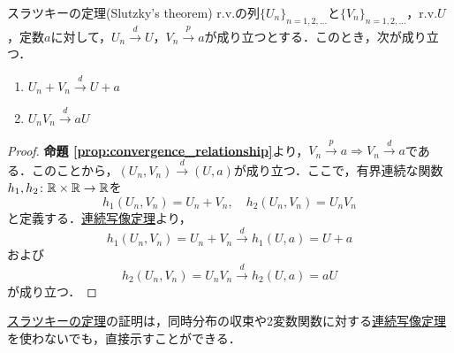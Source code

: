 \documentclass[main.tex]{subfiles}
\begin{document}
\begin{myproposition}{スラツキーの定理(Slutzky's theorem)}
\label{prop:slutzky_theorem} %
  r.v.の列$\{U_n\}_{n=1,2,\dots}$と$\{V_n\}_{n=1,2,\dots}$，r.v.$U$，定数$a$に対して，$U_n \xrightarrow{d} U$，$V_n \xrightarrow{p} a$が成り立つとする．このとき，次が成り立つ．
  \begin{enumerate}[label=(\arabic*)]
    \item $U_n + V_n \xrightarrow{d} U + a$
    \item $U_n V_n \xrightarrow{d} aU$
  \end{enumerate}
\end{myproposition}
\begin{proof}
\textbf{命題 \ref{prop:convergence_relationship}}より，$V_n \xrightarrow{p} a \Rightarrow V_n \xrightarrow{d} a$である．このことから，$(U_n, V_n) \xrightarrow{d} (U,a)$が成り立つ．ここで，有界連続な関数$h_1 , h_2 \colon \mathbb{R} \times \mathbb{R} \to \mathbb{R}$を
\begin{equation}
  h_1 (U_n, V_n) = U_n + V_n, \quad h_2 (U_n, V_n) = U_n V_n
\end{equation}
と定義する．\hyperref[prop:continuous_mapping_theorem]{連続写像定理}より，
\begin{equation}
  h_1 (U_n, V_n) = U_n + V_n \xrightarrow{d} h_1 (U,a) = U + a
\end{equation}
および 
\begin{equation}
  h_2 (U_n, V_n) = U_n V_n \xrightarrow{d} h_2 (U,a) = aU
\end{equation}
が成り立つ．
\end{proof}
\hyperref[prop:slutzky_theorem]{スラツキーの定理}の証明は，同時分布の収束や2変数関数に対する\hyperref[prop:continuous_mapping_theorem]{連続写像定理}を使わないでも，直接示すことができる．
\end{document}
